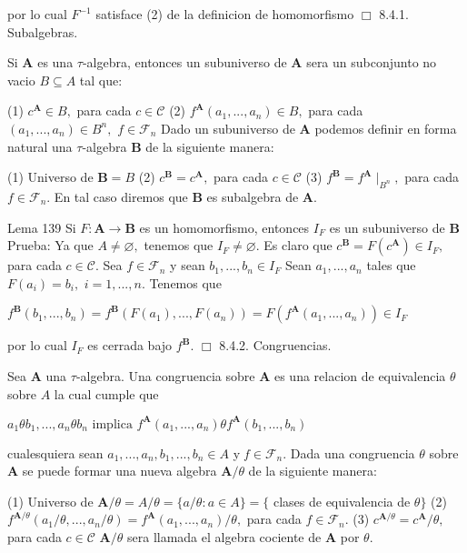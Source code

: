 por lo cual \(F^{-1}\) satisface (2) de la definicion de homomorfismo \(\Box\)
8.4.1. Subalgebras.

Si \(\mathbf{A}\) es una \(\tau \)-algebra, entonces un subuniverso de \( \mathbf{A}\) sera un subconjunto no vacio \(B\subseteq A\) tal que:

(1) \(c^{\mathbf{A}}\in B,\) para cada \(c\in \mathcal{C}\)
(2) \(f^{\mathbf{A}}(a_{1},...,a_{n})\in B,\) para cada \( (a_{1},...,a_{n})\in B^{n},\) \(f\in \mathcal{F}_{n}\)
Dado un subuniverso de \(\mathbf{A}\) podemos definir en forma natural una \(\tau \)-algebra \(\mathbf{B}\) de la siguiente manera:

(1) Universo de \(\mathbf{B}=B\)
(2) \(c^{\mathbf{B}}=c^{\mathbf{A}},\) para cada \(c\in \mathcal{C}\)
(3) \(f^{\mathbf{B}}=f^{\mathbf{A}}\mid _{B^{n}},\) para cada \(f\in \mathcal{F}_{n}\).
En tal caso diremos que \(\mathbf{B}\) es subalgebra de \( \mathbf{A}.\)

Lema 139 Si \(F:\mathbf{A}\rightarrow \mathbf{B}\) es un homomorfismo, entonces \(I_{F}\) es un subuniverso de \(\mathbf{B}\)
Prueba: Ya que \(A\neq \varnothing ,\) tenemos que \(I_{F}\neq \varnothing .\) Es claro que \( c^{\mathbf{B}}=F(c^{\mathbf{A}})\in I_{F},\) para cada \(c\in \mathcal{C}\). Sea \(f\in \mathcal{F}_{n}\) y sean \(b_{1},...,b_{n}\in I_{F}\) Sean \( a_{1},...,a_{n}\) tales que \(F(a_{i})=b_{i},\) \(i=1,...,n\). Tenemos que

\(\displaystyle f^{\mathbf{B}}(b_{1},...,b_{n})=f^{\mathbf{B}}(F(a_{1}),...,F(a_{n}))=F(f^{ \mathbf{A}}(a_{1},...,a_{n}))\in I_{F} \)

por lo cual \(I_{F}\) es cerrada bajo \(f^{\mathbf{B}}\). \(\Box\)
8.4.2. Congruencias.

Sea \(\mathbf{A}\) una \(\tau \)-algebra. Una congruencia sobre \(\mathbf{A}\) es una relacion de equivalencia \(\theta \) sobre \(A\) la cual cumple que

\(\displaystyle a_{1}\theta b_{1},...,a_{n}\theta b_{n}\text{ implica }f^{\mathbf{A} }(a_{1},...,a_{n})\theta f^{\mathbf{A}}(b_{1},...,b_{n}) \)

cualesquiera sean \(a_{1},...,a_{n},b_{1},...,b_{n}\in A\) y\(\;f\in \mathcal{F} _{n}\).
Dada una congruencia \(\theta \) sobre \(\mathbf{A}\) se puede formar una nueva algebra \(\mathbf{A}/\theta \) de la siguiente manera:

(1) Universo de \(\mathbf{A}/\theta =A/\theta =\{a/\theta :a\in A\}=\{\) clases de equivalencia de \(\theta \}\)
(2) \(f^{\mathbf{A}/\theta }(a_{1}/\theta ,...,a_{n}/\theta )=f^{ \mathbf{A}}(a_{1},...,a_{n})/\theta ,\) para cada \(f\in \mathcal{F}_{n}.\)
(3) \(c^{\mathbf{A}/\theta }=c^{\mathbf{A}}/\theta ,\) para cada \(c\in \mathcal{C}\)
\(\mathbf{A}/\theta \) sera llamada el algebra cociente de \( \mathbf{A}\) por \(\theta \).

